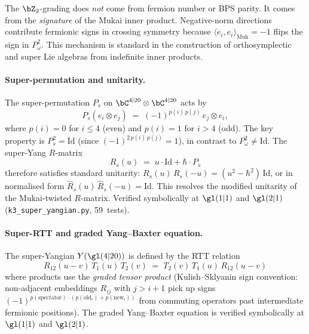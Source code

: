 \begin{remark}
\label{rem:k3-super-origin}
The $\bZ_2$-grading does \emph{not} come from fermion number or
BPS parity.  It comes from the \emph{signature} of the Mukai inner product.
Negative-norm directions contribute fermionic signs in crossing symmetry
because $\langle e_i, e_i \rangle_{\mathrm{Muk}} = -1$ flips the sign in
$P_\omega^2$.  This mechanism is standard in the construction of
orthosymplectic and super Lie algebras from indefinite inner products.
\end{remark}

\paragraph{Super-permutation and unitarity.}
The super-permutation $P_s$ on $\bC^{4|20} \otimes \bC^{4|20}$ acts by
\[
  P_s(e_i \otimes e_j) \;=\; (-1)^{p(i)\, p(j)}\, e_j \otimes e_i,
\]
where $p(i) = 0$ for $i \leq 4$ (even) and $p(i) = 1$ for $i > 4$ (odd).
The key property is $P_s^2 = \mathrm{Id}$ (since $(-1)^{2\,p(i)\,p(j)} = 1$),
in contrast to $P_\omega^2 \neq \mathrm{Id}$.  The super-Yang $R$-matrix
\begin{equation}\label{eq:super-yang-r}
  R_s(u) \;=\; u \cdot \mathrm{Id} + \hbar \cdot P_s
\end{equation}
therefore satisfies standard unitarity:
$R_s(u)\, R_s(-u) = (u^2 - \hbar^2)\, \mathrm{Id}$,
or in normalised form $\hat R_s(u)\, \hat R_s(-u) = \mathrm{Id}$.
This resolves the modified unitarity of the Mukai-twisted $R$-matrix.
Verified symbolically at $\gl(1|1)$ and $\gl(2|1)$
(\texttt{k3\_super\_yangian.py}, 59~tests).

\paragraph{Super-RTT and graded Yang--Baxter equation.}
The super-Yangian $Y(\gl(4|20))$ is defined by the RTT relation
\[
  R_{12}(u - v)\, T_1(u)\, T_2(v) \;=\; T_2(v)\, T_1(u)\, R_{12}(u-v)
\]
where products use the \emph{graded tensor product} (Kulish--Sklyanin sign
convention: non-adjacent embeddings $R_{ij}$ with $j > i+1$ pick up signs
$(-1)^{p(\mathrm{spectator})\cdot(p(\mathrm{old}_i) + p(\mathrm{new}_i))}$
from commuting operators past intermediate fermionic positions).
The graded Yang--Baxter equation is verified symbolically at $\gl(1|1)$
and $\gl(2|1)$.

